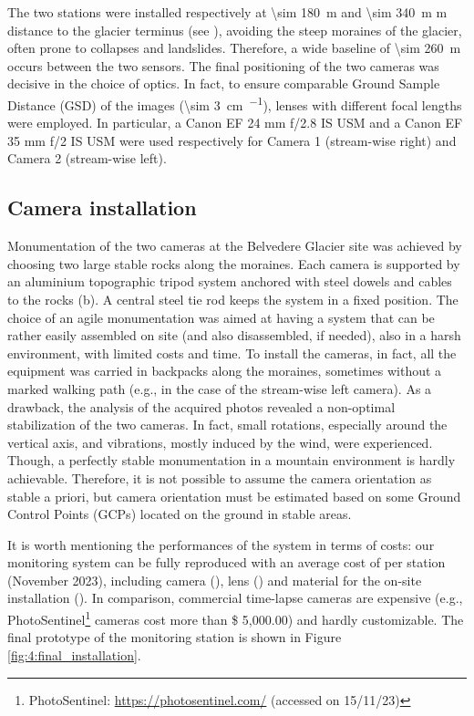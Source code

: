 The two stations were installed respectively at \SI{\sim 180}{\meter} and \SI{\sim 340}{\meter} m distance to
the glacier terminus (see ), avoiding the steep moraines
of the glacier, often prone to collapses and landslides. Therefore, a wide baseline of
\SI{\sim 260}{\meter} occurs between the two sensors.
The final positioning of the two cameras was decisive in the choice of optics.
In fact, to ensure comparable Ground Sample Distance (GSD) of the images (\SI{\sim 3}{\centi\meter\per\pixel}), lenses with different focal lengths were employed.
In particular, a Canon EF 24 mm f/2.8 IS USM and a Canon EF 35 mm f/2 IS USM were used
respectively for Camera 1 (stream-wise right) and Camera 2 (stream-wise left).

\subsection{Camera installation}\label{Monumentation}

Monumentation of the two cameras at the Belvedere Glacier site was achieved by choosing
two large stable rocks along the moraines.
Each camera is supported by an aluminium topographic tripod system anchored with steel
dowels and cables to the rocks (b).
A central steel tie rod keeps the system in a fixed position.
The choice of an agile monumentation was aimed at having a system that can be rather
easily assembled on site (and also disassembled, if needed), also in a harsh environment,
with limited costs and time.
To install the cameras, in fact, all the equipment was carried in backpacks along the
moraines, sometimes without a marked walking path (e.g., in the case of the stream-wise
left camera).
As a drawback, the analysis of the acquired photos revealed a non-optimal stabilization
of the two cameras.
In fact, small rotations, especially around the vertical axis, and vibrations, mostly
induced by the wind, were experienced.
Though, a perfectly stable monumentation in a mountain environment is hardly achievable.
Therefore, it is not possible to assume the camera orientation as stable a priori, but
camera orientation must be estimated based on some Ground Control Points (GCPs) located
on the ground in stable areas.

It is worth mentioning the performances of the system in terms of costs: our  monitoring
system can be fully reproduced with an average cost of  per station
(November 2023), including camera (), lens () and material for
the on-site installation ().
In comparison, commercial time-lapse cameras are expensive
(e.g., PhotoSentinel\footnote{PhotoSentinel: \url{https://photosentinel.com/} (accessed
  on 15/11/23)} cameras cost more than \$ 5,000.00) and hardly customizable.
The final prototype of the monitoring station is shown in Figure
\ref{fig:4:final_installation}.

